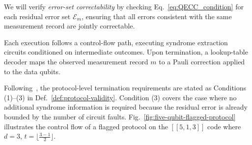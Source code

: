 \documentclass[acmsmall,screen,review,anonymous,nonacm]{acmart}
\newcommand{\showcomment}[1]{#1}
\newcommand{\bw}[1]{\showcomment{\textcolor{green}{\textbf{BW:} #1}}}
\begin{document}
We will verify \emph{error-set correctability} by checking
Eq.~\ref{eq:QECC_condition} for each residual error set
$\mathcal E_m$, ensuring that all errors consistent with the
same measurement record are jointly correctable.

Each execution follows a control-flow path, executing syndrome extraction circuits conditioned on intermediate outcomes. Upon termination, a lookup-table decoder maps the observed measurement record $m$ to a Pauli correction applied to the data qubits.

% 
% 

% 
% 


Following~\cite{CB18}, the protocol-level termination requirements
are stated as Conditions (1)--(3) in
Def.~\ref{def:protocol-validity}. Condition (3) covers the case where
no additional syndrome information is required because the residual
error is already bounded by the number of circuit faults.
Fig.~\ref{fig:five-qubit-flagged-protocol} illustrates the control flow of a flagged protocol on the $[[5,1,3]]$ code where $d=3$, $t= \lfloor \frac{3-1}{2 } \rfloor$. 

\end{document}

